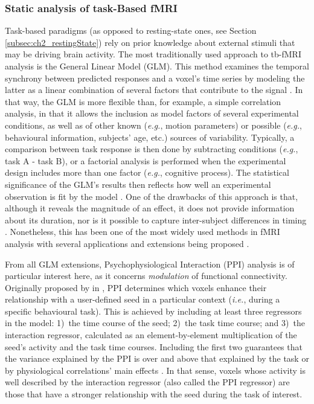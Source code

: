 \subsubsection{Static analysis of task-Based fMRI}

Task-based paradigms (as opposed to resting-state ones, see Section \ref{subsec:ch2_restingState}) rely on prior knowledge about external stimuli that may be driving brain activity. The most traditionally used approach to tb-fMRI analysis is the General Linear Model (GLM). This method examines the temporal synchrony between predicted responses and a voxel’s time series by modeling the latter as a linear combination of several factors that contribute to the signal \citep{Friston1995a}. In that way, the GLM is more flexible than, for example, a simple correlation analysis, in that it allows the inclusion as model factors of several experimental conditions, as well as of other known (\textit{e.g.}, motion parameters) or possible (\textit{e.g.}, behavioural information, subjects’ age, etc.) sources of variability. Typically, a comparison between task response is then done by subtracting conditions (\textit{e.g.}, task A - task B), or a factorial analysis is performed when the experimental design includes more than one factor (\textit{e.g.}, cognitive process). The statistical significance of the GLM’s results then reflects how well an experimental observation is fit by the model \citep{Worsley1995}. One of the drawbacks of this approach is that, although it reveals the magnitude of an effect, it does not provide information about its duration, nor is it possible to capture inter-subject differences in timing \citep{Robinson2009}. Nonetheless, this has been one of the most widely used methods in fMRI analysis with several applications and extensions being proposed \citep{Dale1999, Glover1999, Goldman2000, Laufs2003}.

From all GLM extensions, Psychophysiological Interaction (PPI) analysis is of particular interest here, as it concerns \textit{modulation} of functional connectivity. Originally proposed by \citeauthor{Friston1997} in \citeyear{Friston1997}, PPI determines which voxels enhance their relationship with a user-defined seed in a particular context (\textit{i.e.}, during a specific behavioural task). This is achieved by including at least three regressors in the model: 1)~the time course of the seed; 2)~the task time course; and 3)~the interaction regressor, calculated as an element-by-element multiplication of the seed’s activity and the task time courses. Including the first two guarantees that the variance explained by the PPI is over and above that explained by the task or by physiological correlations’ main effects \citep{OReilly2012a}. In that sense, voxels whose activity is well described by the interaction regressor (also called the PPI regressor) are those that have a stronger relationship with the seed during the task of interest. 

